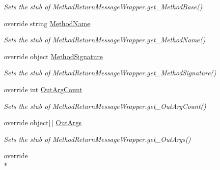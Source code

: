 \begin{DoxyCompactItemize}
\begin{DoxyCompactList}\small\item\em Sets the stub of Method\-Return\-Message\-Wrapper.\-get\-\_\-\-Method\-Base()\end{DoxyCompactList}\item 
override string \hyperlink{class_system_1_1_runtime_1_1_remoting_1_1_messaging_1_1_fakes_1_1_stub_method_return_message_wrapper_a1ae78f4d7116be05134ab44e8020012e}{Method\-Name}
\begin{DoxyCompactList}\small\item\em Sets the stub of Method\-Return\-Message\-Wrapper.\-get\-\_\-\-Method\-Name()\end{DoxyCompactList}\item 
override object \hyperlink{class_system_1_1_runtime_1_1_remoting_1_1_messaging_1_1_fakes_1_1_stub_method_return_message_wrapper_a28cbc7c85e167e1c277bc275874d6754}{Method\-Signature}
\begin{DoxyCompactList}\small\item\em Sets the stub of Method\-Return\-Message\-Wrapper.\-get\-\_\-\-Method\-Signature()\end{DoxyCompactList}\item 
override int \hyperlink{class_system_1_1_runtime_1_1_remoting_1_1_messaging_1_1_fakes_1_1_stub_method_return_message_wrapper_a74ce74a0e39c049c867a76fb03aa4e42}{Out\-Arg\-Count}
\begin{DoxyCompactList}\small\item\em Sets the stub of Method\-Return\-Message\-Wrapper.\-get\-\_\-\-Out\-Arg\-Count()\end{DoxyCompactList}\item 
override object\mbox{[}$\,$\mbox{]} \hyperlink{class_system_1_1_runtime_1_1_remoting_1_1_messaging_1_1_fakes_1_1_stub_method_return_message_wrapper_a0f992c15fb490a7a97eb5252dbd4294a}{Out\-Args}
\begin{DoxyCompactList}\small\item\em Sets the stub of Method\-Return\-Message\-Wrapper.\-get\-\_\-\-Out\-Args()\end{DoxyCompactList}\item 
override \\*

\end{DoxyCompactItemize}
